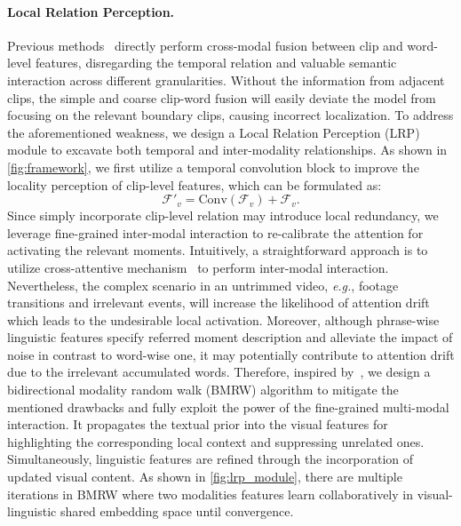 \documentclass[10pt,twocolumn,letterpaper]{article}
\begin{document}
\paragraph{Local Relation Perception.}
Previous methods~\cite{momentdetr, umt, qddetr} directly perform cross-modal fusion between clip and word-level features, disregarding the temporal relation and valuable semantic interaction across different granularities. Without the information from adjacent clips, the simple and coarse clip-word fusion will easily deviate the model from focusing on the relevant boundary clips, causing incorrect localization. 
To address the aforementioned weakness, we design a Local Relation Perception (LRP) module to excavate both temporal and inter-modality relationships.
As shown in \cref{fig:framework}, we first utilize a temporal convolution block to improve the locality perception of clip-level features, which can be formulated as:
\begin{equation}
    \mathcal{F'}_{v} = \mathrm{Conv}\left(\mathcal{F}_v\right) + \mathcal{F}_v.
\end{equation}
Since simply incorporate clip-level relation may introduce local redundancy, we leverage fine-grained inter-modal interaction to re-calibrate the attention for activating the relevant moments. 
Intuitively, a straightforward approach is to utilize cross-attentive mechanism~\cite{qddetr, umt} to perform inter-modal interaction.
Nevertheless, the complex scenario in an untrimmed video, \textit{e.g.}, footage transitions and irrelevant events, will increase the likelihood of attention drift which leads to the undesirable local activation.
Moreover, although phrase-wise linguistic features specify referred moment description and alleviate the impact of noise in contrast to word-wise one, it may potentially contribute to attention drift due to the irrelevant accumulated words.
Therefore, inspired by~\cite{rskp,Giannis2020,Grady2006}, we design a  
bidirectional modality random walk (BMRW) algorithm to mitigate the mentioned drawbacks and fully exploit the power of the fine-grained multi-modal interaction.
It propagates the textual prior into the visual features for highlighting the corresponding local context and suppressing unrelated ones.
Simultaneously, linguistic features are refined through the incorporation of updated visual content. 
As shown in \cref{fig:lrp_module}, there are multiple iterations in BMRW where two modalities features learn collaboratively in visual-linguistic shared embedding space until convergence.
\end{document}
